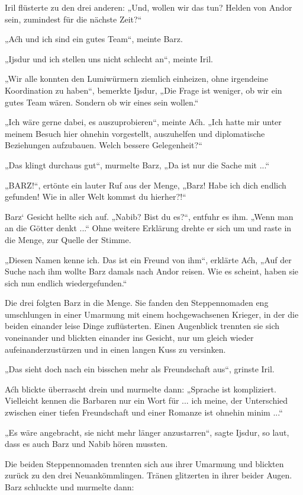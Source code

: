Iril flüsterte zu den drei anderen: „Und, wollen wir das tun? Helden von Andor sein, zumindest für die nächste Zeit?“

„Aćh und ich sind ein gutes Team“, meinte Barz.

„Ijsdur und ich stellen uns nicht schlecht an“, meinte Iril.

„Wir alle konnten den Lumiwürmern ziemlich einheizen, ohne irgendeine Koordination zu haben“, bemerkte Ijsdur, „Die Frage ist weniger, ob wir ein gutes Team wären. Sondern ob wir eines sein wollen.“

„Ich wäre gerne dabei, es auszuprobieren“, meinte Aćh. „Ich hatte mir unter meinem Besuch hier ohnehin vorgestellt, auszuhelfen und diplomatische Beziehungen aufzubauen. Welch bessere Gelegenheit?“

„Das klingt durchaus gut“, murmelte Barz, „Da ist nur die Sache mit ...“

„BARZ!“, ertönte ein lauter Ruf aus der Menge, „Barz! Habe ich dich endlich gefunden! Wie in aller Welt kommst du hierher?!“

Barz‘ Gesicht hellte sich auf. „Nabib? Bist du es?“, entfuhr es ihm. „Wenn man an die Götter denkt ...“ Ohne weitere Erklärung drehte er sich um und raste in die Menge, zur Quelle der Stimme.

„Diesen Namen kenne ich. Das ist ein Freund von ihm“, erklärte Aćh, „Auf der Suche nach ihm wollte Barz damals nach Andor reisen. Wie es scheint, haben sie sich nun endlich wiedergefunden.“

Die drei folgten Barz in die Menge. Sie fanden den Steppennomaden eng umschlungen in einer Umarmung mit einem hochgewachsenen Krieger, in der die beiden einander leise Dinge zuflüsterten. Einen Augenblick trennten sie sich voneinander und blickten einander ins Gesicht, nur um gleich wieder aufeinanderzustürzen und in einen langen Kuss zu versinken.

„Das sieht doch nach ein bisschen mehr als Freundschaft aus“, grinste Iril.

Aćh blickte überrascht drein und murmelte dann: „Sprache ist kompliziert. Vielleicht kennen die Barbaren nur ein Wort für ... ich meine, der Unterschied zwischen einer tiefen Freundschaft und einer Romanze ist ohnehin minim ...“

„Es wäre angebracht, sie nicht mehr länger anzustarren“, sagte Ijsdur, so laut, dass es auch Barz und Nabib hören mussten.

Die beiden Steppennomaden trennten sich aus ihrer Umarmung und blickten zurück zu den drei Neuankömmlingen. Tränen glitzerten in ihrer beider Augen. Barz schluckte und murmelte dann:

